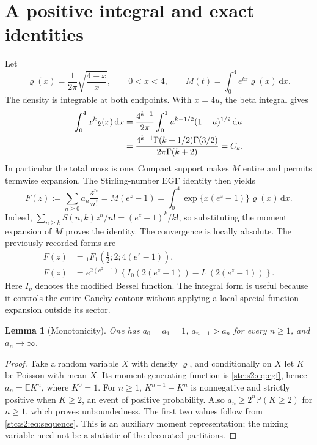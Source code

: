 \documentclass[11pt,letterpaper]{article}
\numberwithin{equation}{section}
\newtheorem{lemma}[theorem]{Lemma}
\theoremstyle{remark}\newtheorem{remark}[theorem]{Remark}
\newcommand{\E}{\mathbb E}
\newcommand{\dd}{\,\mathrm d}
\newcommand{\Prob}{\mathbb P}
\begin{document}
\section{A positive integral and exact identities}\label{stc:s2:sec:exact}
Let
\begin{equation}\label{stc:s2:eq:density}
 \varrho(x)=\frac1{2\pi}\sqrt{\frac{4-x}{x}},\qquad 0<x<4,
 \qquad M(t)=\int_0^4e^{tx}\varrho(x)\dd x.
\end{equation}
The density is integrable at both endpoints. With $x=4u$, the beta integral gives
\begin{align}
 \int_0^4x^k\varrho(x)\dd x
 &=\frac{4^{k+1}}{2\pi}\int_0^1u^{k-1/2}(1-u)^{1/2}\dd u\notag\\
 &=\frac{4^{k+1}\Gamma(k+1/2)\Gamma(3/2)}{2\pi\Gamma(k+2)}
 =C_k.\label{stc:s2:eq:beta}
\end{align}
In particular the total mass is one. Compact support makes $M$ entire and permits termwise expansion. The Stirling-number EGF identity then yields
\begin{equation}\label{stc:s2:eq:egf}
 F(z):=\sum_{n\ge0}a_n\frac{z^n}{n!}
 =M(e^z-1)
 =\int_0^4\exp\{x(e^z-1)\}\varrho(x)\dd x.
\end{equation}
Indeed, $\sum_{n\ge k}S(n,k)z^n/n!=(e^z-1)^k/k!$, so substituting the moment expansion of $M$ proves the identity. The convergence is locally absolute. The previously recorded forms \cite{oeisA064856} are
\begin{align}
 F(z)&={}_1F_1\!\left(\tfrac12;2;4(e^z-1)\right),\label{stc:s2:eq:hyper}\\
 F(z)&=e^{2(e^z-1)}\left\{I_0(2(e^z-1))-I_1(2(e^z-1))\right\}.
 \label{stc:s2:eq:bessel}
\end{align}
Here $I_\nu$ denotes the modified Bessel function. The integral form is useful because it controls the entire Cauchy contour without applying a local special-function expansion outside its sector.

\begin{lemma}[Monotonicity]\label{stc:s2:lem:monotone}
One has $a_0=a_1=1$, $a_{n+1}>a_n$ for every $n\ge1$, and $a_n\to\infty$.
\end{lemma}
\begin{proof}
Take a random variable $X$ with density $\varrho$, and conditionally on $X$ let $K$ be Poisson with mean $X$. Its moment generating function is \eqref{stc:s2:eq:egf}, hence $a_n=\E K^n$, where $K^0=1$. For $n\ge1$, $K^{n+1}-K^n$ is nonnegative and strictly positive when $K\ge2$, an event of positive probability. Also $a_n\ge2^n\Prob(K\ge2)$ for $n\ge1$, which proves unboundedness. The first two values follow from \eqref{stc:s2:eq:sequence}. This is an auxiliary moment representation; the mixing variable need not be a statistic of the decorated partitions.
\end{proof}
\end{document}
